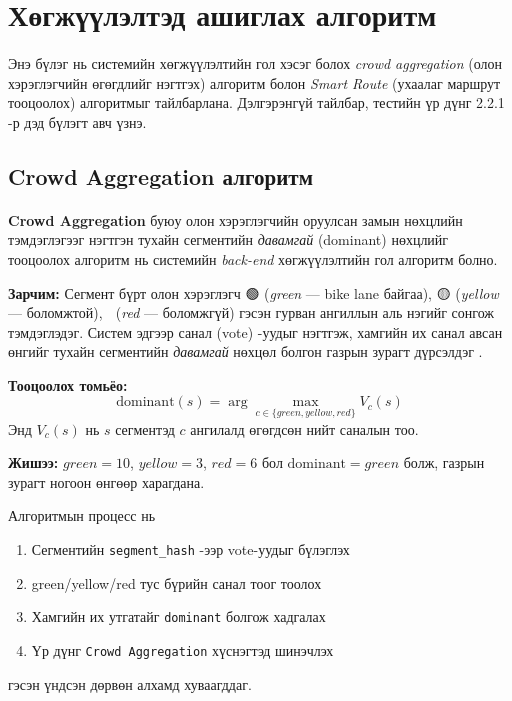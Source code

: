 \section{Хөгжүүлэлтэд ашиглах алгоритм}
\paragraph{} Энэ бүлэг нь системийн хөгжүүлэлтийн гол хэсэг болох \textit{crowd aggregation} (олон хэрэглэгчийн өгөгдлийг нэгтгэх) алгоритм болон \textit{Smart Route} (ухаалаг маршрут тооцоолох) алгоритмыг тайлбарлана. Дэлгэрэнгүй тайлбар, тестийн үр дүнг 2.2.1 -р дэд бүлэгт авч үзнэ.

\subsection{Crowd Aggregation алгоритм}
\paragraph{}
\textbf{Crowd Aggregation} буюу олон хэрэглэгчийн оруулсан замын нөхцлийн тэмдэглэгээг нэгтгэн тухайн сегментийн \emph{давамгай} (dominant) нөхцлийг тооцоолох алгоритм нь системийн \textit{back-end} хөгжүүлэлтийн гол алгоритм болно.

\textbf{Зарчим:} Сегмент бүрт олон хэрэглэгч 🟢 (\textit{green} — bike lane байгаа), 🟡 (\textit{yellow} — боломжтой), 🔴 (\textit{red} — боломжгүй) гэсэн гурван ангиллын аль нэгийг сонгож тэмдэглэдэг. Систем эдгээр санал (vote) -уудыг нэгтгэж, хамгийн их санал авсан өнгийг тухайн сегментийн \emph{давамгай} нөхцөл болгон газрын зурагт дүрсэлдэг \cite{crowdsource}.

\textbf{Тооцоолох томьёо:}
\begin{equation}
    \text{dominant}(s) = \arg\max_{c \in \{green, yellow, red\}} V_c(s)
\end{equation}
Энд $V_c(s)$ нь $s$ сегментэд $c$ ангилалд өгөгдсөн нийт саналын тоо.

\textbf{Жишээ:} $green = 10$, $yellow = 3$, $red = 6$ бол $\text{dominant} = green$ болж, газрын зурагт ногоон өнгөөр харагдана.

Алгоритмын процесс нь
\begin{enumerate}
    \item Сегментийн \texttt{segment\_hash} -ээр vote-уудыг бүлэглэх
    \item green/yellow/red тус бүрийн санал тоог тоолох
    \item Хамгийн их утгатайг \texttt{dominant} болгож хадгалах
    \item Үр дүнг \texttt{Crowd Aggregation} хүснэгтэд шинэчлэх
\end{enumerate}
гэсэн үндсэн дөрвөн алхамд хуваагддаг.

